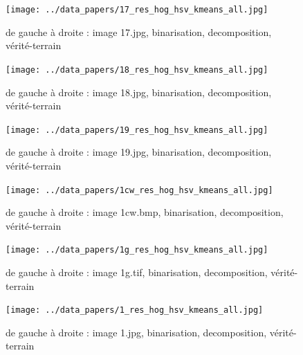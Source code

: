\documentclass{book}
\begin{document}
\begin{figure}[H]
\begin{center}
\texttt{[image: ../data\_papers/17\_res\_hog\_hsv\_kmeans\_all.jpg]}
\end{center}
\caption{de gauche à droite : image 17.jpg, binarisation, decomposition, vérité-terrain}
\label{17}
\end{figure}
\clearpage


\begin{figure}[H]
\begin{center}
\texttt{[image: ../data\_papers/18\_res\_hog\_hsv\_kmeans\_all.jpg]}
\end{center}
\caption{de gauche à droite : image 18.jpg, binarisation, decomposition, vérité-terrain}
\label{18}
\end{figure}
\clearpage


\begin{figure}[H]
\begin{center}
\texttt{[image: ../data\_papers/19\_res\_hog\_hsv\_kmeans\_all.jpg]}
\end{center}
\caption{de gauche à droite : image 19.jpg, binarisation, decomposition, vérité-terrain}
\label{19}
\end{figure}
\clearpage


\begin{figure}[H]
\begin{center}
\texttt{[image: ../data\_papers/1cw\_res\_hog\_hsv\_kmeans\_all.jpg]}
\end{center}
\caption{de gauche à droite : image 1cw.bmp, binarisation, decomposition, vérité-terrain}
\label{1cw}
\end{figure}
\clearpage


\begin{figure}[H]
\begin{center}
\texttt{[image: ../data\_papers/1g\_res\_hog\_hsv\_kmeans\_all.jpg]}
\end{center}
\caption{de gauche à droite : image 1g.tif, binarisation, decomposition, vérité-terrain}
\label{1g}
\end{figure}
\clearpage


\begin{figure}[H]
\begin{center}
\texttt{[image: ../data\_papers/1\_res\_hog\_hsv\_kmeans\_all.jpg]}
\end{center}
\caption{de gauche à droite : image 1.jpg, binarisation, decomposition, vérité-terrain}
\label{1}
\end{figure}
\clearpage
\end{document}
